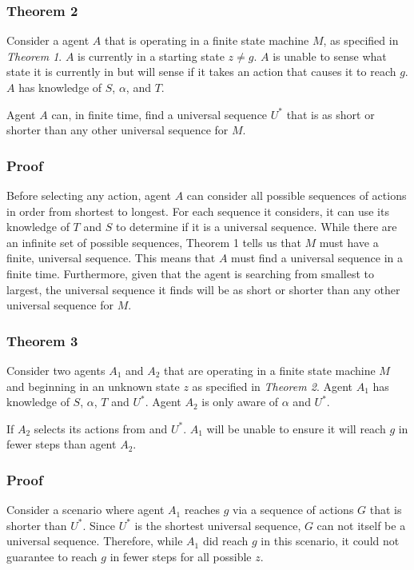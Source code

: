 \documentclass[letterpaper]{article} %
\begin{document}
\subsubsection{Theorem 2} Consider a agent $A$ that is operating in
a finite state machine $M$, as specified in \textit{Theorem 1}.  $A$
is currently in a starting state $z \neq g$.  $A$ is unable to sense
what state it is currently in but will sense if it takes an action
that causes it to reach $g$.  $A$ has knowledge of $S$, $\alpha$, and
$T$.

Agent $A$ can, in finite time, find a universal sequence $U^*$ that is
as short or shorter than any other universal sequence for $M$.

\subsubsection{Proof} Before selecting any action, agent $A$ can
consider all possible sequences of actions in order from shortest to
longest.  For each sequence it considers, it can use its knowledge of
$T$ and $S$ to determine if it is a universal sequence.  While there
are an infinite set of possible sequences, {Theorem 1} tells us that
$M$ must have a finite, universal sequence.  This means that $A$ must
find a universal sequence in a finite time.  Furthermore, given that
the agent is searching from smallest to largest, the universal
sequence it finds will be as short or shorter than any other universal
sequence for $M$.

\subsubsection{Theorem 3} Consider two agents $A_1$ and $A_2$ that
are operating in a finite state machine $M$ and beginning in an
unknown state $z$ as specified in \textit{Theorem 2}.  Agent $A_1$ has
knowledge of $S$, $\alpha$, $T$ and $U^*$.  Agent $A_2$ is only aware
of $\alpha$ and $U^*$.

If $A_2$ selects its actions from and $U^*$.  $A_1$ will be unable to
ensure it will reach $g$ in fewer steps than agent $A_2$.

\subsubsection{Proof} Consider a scenario where agent $A_1$ reaches
$g$ via a sequence of actions $G$ that is shorter than $U^*$.  Since
$U^*$ is the shortest universal sequence, $G$ can not itself be a
universal sequence.  Therefore, while $A_1$ did reach $g$ in this
scenario, it could not guarantee to reach $g$ in fewer steps for all
possible $z$.
\end{document}
